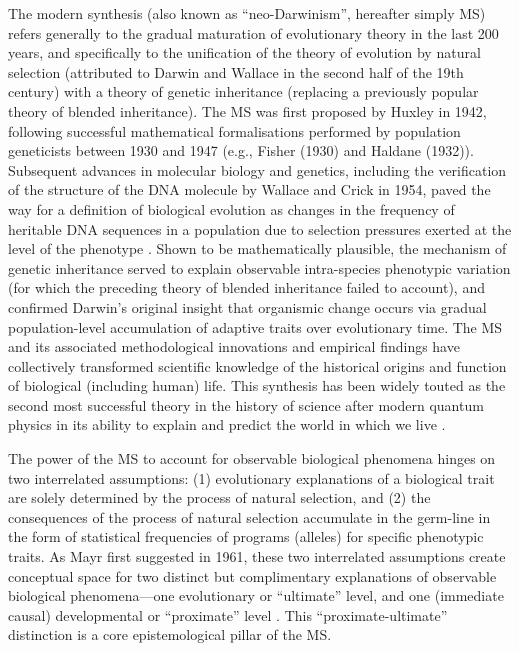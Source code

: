The modern synthesis (also known as ``neo-Darwinism'', hereafter simply MS) refers generally to the gradual maturation of evolutionary theory in the last 200 years, and specifically to the unification of the theory of evolution by natural selection (attributed to Darwin and Wallace in the second half of the 19th century) with a theory of genetic inheritance (replacing a previously popular theory of blended inheritance).  The MS was first proposed by Huxley in 1942, following successful mathematical formalisations performed by population geneticists between 1930 and 1947 (e.g., Fisher (1930) and Haldane (1932)).  Subsequent advances in molecular biology and genetics, including the verification of the structure of the DNA molecule by Wallace and Crick in 1954, paved the way for a definition of biological evolution as changes in the frequency of heritable DNA sequences in a population due to selection pressures exerted at the level of the phenotype \citep{Dawkins1976,Grafen1984}.  Shown to be mathematically plausible, the mechanism of genetic inheritance served to explain observable intra-species phenotypic variation (for which the preceding theory of blended inheritance failed to account), and confirmed Darwin's original insight that organismic change occurs via gradual population-level accumulation of adaptive traits over evolutionary time. The MS and its associated methodological innovations and empirical findings have collectively transformed scientific knowledge of the historical origins and function of biological (including human) life. This synthesis has been widely touted as the second most successful theory in the history of science after modern quantum physics in its ability to explain and predict the world in which we live \citep{Dunbar1996}.

The power of the MS to account for observable biological phenomena hinges on two interrelated assumptions: (1) evolutionary explanations of a biological trait are solely determined by the process of natural selection, and (2) the consequences of the process of natural selection accumulate in the germ-line in the form of statistical frequencies of programs (alleles) for specific phenotypic traits.  As Mayr first suggested in 1961, these two interrelated assumptions create conceptual space for two distinct but complimentary explanations of observable biological phenomena---one evolutionary or ``ultimate'' level, and one (immediate causal) developmental or ``proximate'' level \citep{Mayr1961}.  This ``proximate-ultimate'' distinction is a core epistemological pillar of the MS.

